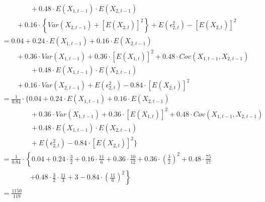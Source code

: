 \begin{solution}
\begin{equation}
\begin{aligned}
							& \qquad \qquad + 0.48 \cdot E(X_{1,t-1}) \cdot E(X_{2,t-1}) \\ 
							& \qquad				+ 0.16 \cdot \left\{ Var(X_{2,t-1}) + [E(X_{2,t})]^2 \right\}  
							        				+ E(\epsilon_{2,t}^2) - [E(X_{2,t})]^2 \\	
							& = 0.04 + 0.24 \cdot E(X_{1,t-1}) + 0.16 \cdot E(X_{2,t-1}) \\
							& \qquad			  + 0.36 \cdot Var(X_{1,t-1}) + 0.36 \cdot [E(X_{1,t})]^2 + 0.48 \cdot Cov(X_{1,t-1},X_{2,t-1})  \\
							& \qquad \qquad + 0.48 \cdot E(X_{1,t-1}) \cdot E(X_{2,t-1}) \\ 
							& \qquad				+ 0.16 \cdot Var(X_{2,t-1})  
							        				+ E(\epsilon_{2,t}^2) - 0.84 \cdot [E(X_{2,t})]^2 \\
							& = \frac{1}{0.84} \cdot \{0.04 + 0.24 \cdot E(X_{1,t-1}) + 0.16 \cdot E(X_{2,t-1}) \\
							& \qquad \qquad + 0.36 \cdot Var(X_{1,t-1}) + 0.36 \cdot [E(X_{1,t})]^2 + 0.48 \cdot Cov(X_{1,t-1},X_{2,t-1})  \\
							& \qquad \qquad + 0.48 \cdot E(X_{1,t-1}) \cdot E(X_{2,t-1}) \\ 
							& \qquad \qquad + E(\epsilon_{2,t}^2) - 0.84 \cdot [E(X_{2,t})]^2 \} \\
							& = \frac{1}{0.84} \cdot \left\{0.04 + 0.24 \cdot \frac{3}{2} + 0.16 \cdot \frac{11}{6}
							                + 0.36 \cdot \frac{10}{12} + 0.36 \cdot \left(\frac{3}{2}\right)^2 + 0.48 \cdot \frac{75}{17} \right. \\
							& \qquad \qquad \left. + 0.48 \cdot \frac{3}{2} \cdot \frac{11}{3}  
							                + 3 - 0.84 \cdot \left(\frac{11}{6}\right)^2 \right\} \\
							& = \frac{1150}{119}
\end{aligned}
\end{equation}


\end{solution}
